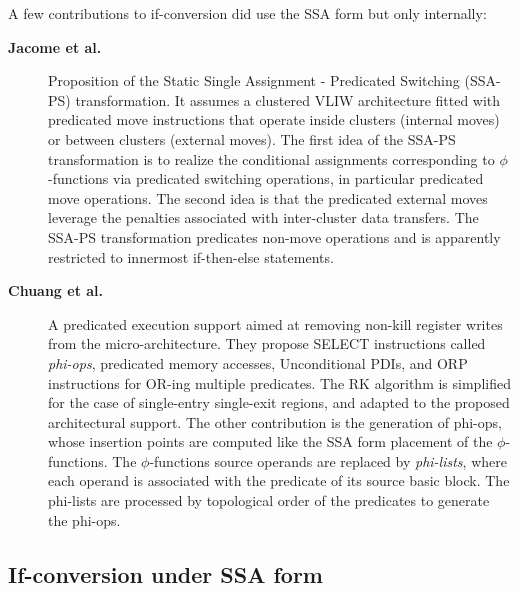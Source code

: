 A few contributions to if-conversion did use the SSA form
but only internally: \begin{description}

\item[\textbf{Jacome et al. \cite{Jacome:2001:DAC}}] Proposition of the Static
Single Assignment - Predicated Switching (SSA-PS) transformation. It assumes a
clustered VLIW architecture fitted with predicated move instructions that
operate inside clusters (internal moves) or between clusters (external moves).
The first idea of the SSA-PS transformation is to realize the conditional
assignments corresponding to $\phi$-functions via predicated switching
operations, in particular predicated move operations. The second idea is that
the predicated external moves leverage the penalties associated with
inter-cluster data transfers. The SSA-PS transformation predicates non-move
operations and is apparently restricted to innermost if-then-else statements.

\item[\textbf{Chuang et al. \cite{Chuang:2003:CGO}}] A predicated execution
support aimed at removing non-kill register writes from the micro-architecture.
They propose SELECT instructions called \emph{phi-ops}, predicated memory
accesses, Unconditional PDIs, and ORP instructions for OR-ing multiple
predicates. The RK algorithm is simplified for the case of single-entry single-exit
regions, and adapted to the proposed architectural support.
The other contribution is the generation of {phi-ops}, whose insertion points
are computed like the SSA form placement of the $\phi$-functions. The
$\phi$-functions source operands are replaced by \emph{phi-lists}, where each
operand is associated with the predicate of its source basic block. The
phi-lists are processed by topological order of the predicates to
generate the {phi-ops}.

\end{description}


\subsection{If-conversion under SSA form}

